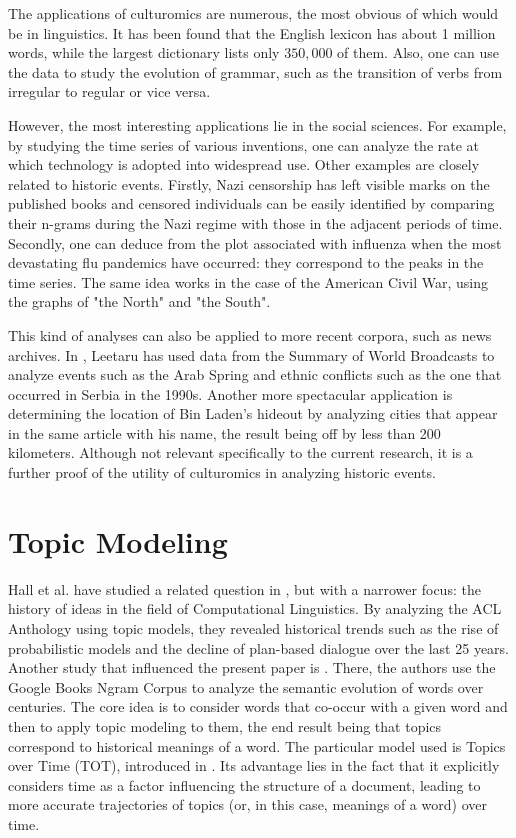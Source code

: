 The applications of culturomics are numerous, the most obvious of which would be in linguistics. It has been found that the English lexicon has about 1 million words, while the largest dictionary lists only $350,000$ of them. Also, one can use the data to study the evolution of grammar, such as the transition of verbs from irregular to regular or vice versa.

However, the most interesting applications lie in the social sciences. For example, by studying the time series of various inventions, one can analyze the rate at which technology is adopted into widespread use. Other examples are closely related to historic events. Firstly, Nazi censorship has left visible marks on the published books and censored individuals can be easily identified by comparing their n-grams during the Nazi regime with those in the adjacent periods of time. Secondly, one can deduce from the plot associated with influenza when the most devastating flu pandemics have occurred: they correspond to the peaks in the time series. The same idea works in the case of the American Civil War, using the graphs of "the North" and "the South".

This kind of analyses can also be applied to more recent corpora, such as news archives. In \cite{leetaru11culturomics}, Leetaru has used data from the Summary of World Broadcasts to analyze events such as the Arab Spring and ethnic conflicts such as the one that occurred in Serbia in the 1990s. Another more spectacular application is determining the location of Bin Laden's hideout by analyzing cities that appear in the same article with his name, the result being off by less than 200 kilometers. Although not relevant specifically to the current research, it is a further proof of the utility of culturomics in analyzing historic events.

\section{Topic Modeling}
\label{sec:topic-modeling}

Hall et al. have studied a related question in \cite{Hall:2008:SHI:1613715.1613763}, but with a narrower focus: the history of ideas in the field of Computational Linguistics. By analyzing the ACL Anthology using topic models, they revealed historical trends such as the rise of probabilistic models and the decline of plan-based dialogue over the last 25 years. Another study that influenced the present paper is \cite{Wijaya:2011:USC:2064448.2064475}. There, the authors use the Google Books Ngram Corpus to analyze the semantic evolution of words over centuries. The core idea is to consider words that co-occur with a given word and then to apply topic modeling to them, the end result being that topics correspond to historical meanings of a word. The particular model used is Topics over Time (TOT), introduced in \cite{Wang:2006:TOT:1150402.1150450}. Its advantage lies in the fact that it explicitly considers time as a factor influencing the structure of a document, leading to more accurate trajectories of topics (or, in this case, meanings of a word) over time.
